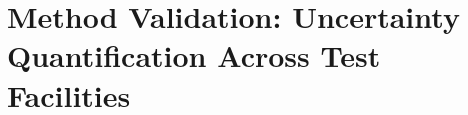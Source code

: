 \chapter[Method Validation]{Method Validation: Uncertainty Quantification Across Test Facilities}\label{ch:method_validation}





